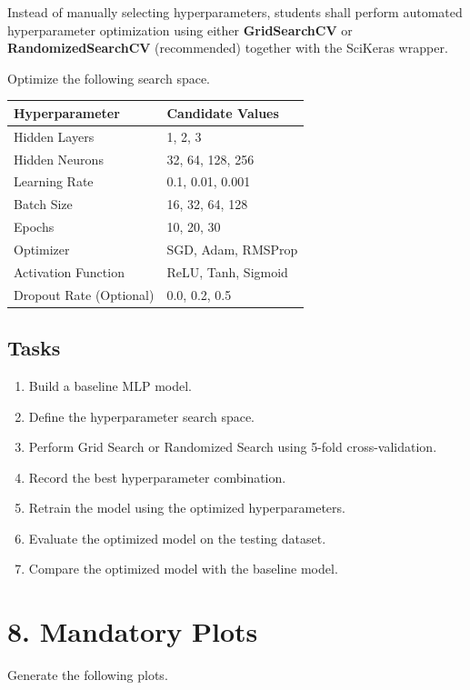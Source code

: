 \documentclass[11pt]{article}
\begin{document}
Instead of manually selecting hyperparameters, students shall perform automated hyperparameter optimization using either \textbf{GridSearchCV} or \textbf{RandomizedSearchCV} (recommended) together with the SciKeras wrapper.

Optimize the following search space.

\begin{center}
\begin{tabular}{|p{5cm}|p{7cm}|}
\hline
Hyperparameter & Candidate Values\\
\hline
Hidden Layers & 1, 2, 3\\
Hidden Neurons & 32, 64, 128, 256\\
Learning Rate & 0.1, 0.01, 0.001\\
Batch Size & 16, 32, 64, 128\\
Epochs & 10, 20, 30\\
Optimizer & SGD, Adam, RMSProp\\
Activation Function & ReLU, Tanh, Sigmoid\\
Dropout Rate (Optional) & 0.0, 0.2, 0.5\\
\hline
\end{tabular}
\end{center}

\subsection*{Tasks}

\begin{enumerate}
\item Build a baseline MLP model.
\item Define the hyperparameter search space.
\item Perform Grid Search or Randomized Search using 5-fold cross-validation.
\item Record the best hyperparameter combination.
\item Retrain the model using the optimized hyperparameters.
\item Evaluate the optimized model on the testing dataset.
\item Compare the optimized model with the baseline model.
\end{enumerate}

\section*{8. Mandatory Plots}

Generate the following plots.
\end{document}
